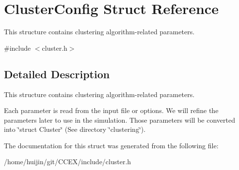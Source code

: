 \hypertarget{structClusterConfig}{\section{Cluster\-Config Struct Reference}
\label{structClusterConfig}
}


This structure contains clustering algorithm-\/related parameters.  




{\ttfamily \#include $<$cluster.\-h$>$}



\subsection{Detailed Description}
This structure contains clustering algorithm-\/related parameters. 

Each parameter is read from the input file or options. We will refine the parameters later to use in the simulation. Those parameters will be converted into \char`\"{}struct Cluster\char`\"{} (See directory \char`\"{}clustering\char`\"{}). 

The documentation for this struct was generated from the following file\-:\begin{DoxyCompactItemize}
\item 
/home/huijin/git/\-C\-C\-E\-X/include/cluster.\-h\end{DoxyCompactItemize}
